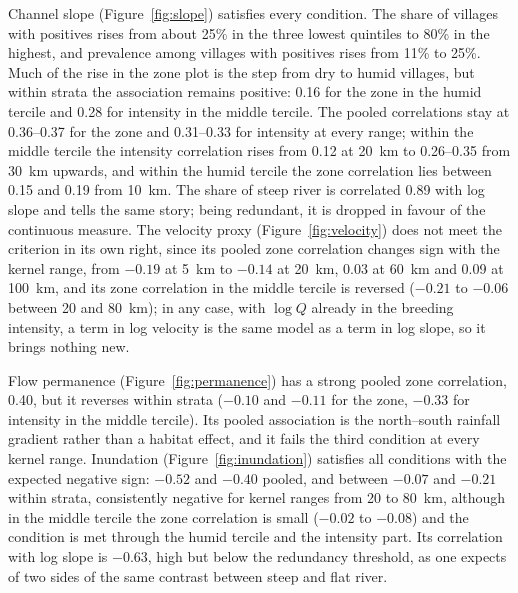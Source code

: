 \documentclass[11pt,a4paper]{article}
\begin{document}
Channel slope (Figure~\ref{fig:slope}) satisfies every condition. The share of villages with positives rises from about 25\% in the three lowest quintiles to 80\% in the highest, and prevalence among villages with positives rises from 11\% to 25\%. Much of the rise in the zone plot is the step from dry to humid villages, but within strata the association remains positive: 0.16 for the zone in the humid tercile and 0.28 for intensity in the middle tercile. The pooled correlations stay at 0.36--0.37 for the zone and 0.31--0.33 for intensity at every range; within the middle tercile the intensity correlation rises from 0.12 at 20~km to 0.26--0.35 from 30~km upwards, and within the humid tercile the zone correlation lies between 0.15 and 0.19 from 10~km. The share of steep river is correlated 0.89 with log slope and tells the same story; being redundant, it is dropped in favour of the continuous measure. The velocity proxy (Figure~\ref{fig:velocity}) does not meet the criterion in its own right, since its pooled zone correlation changes sign with the kernel range, from $-0.19$ at 5~km to $-0.14$ at 20~km, 0.03 at 60~km and 0.09 at 100~km, and its zone correlation in the middle tercile is reversed ($-0.21$ to $-0.06$ between 20 and 80~km); in any case, with $\log Q$ already in the breeding intensity, a term in log velocity is the same model as a term in log slope, so it brings nothing new.

Flow permanence (Figure~\ref{fig:permanence}) has a strong pooled zone correlation, 0.40, but it reverses within strata ($-0.10$ and $-0.11$ for the zone, $-0.33$ for intensity in the middle tercile). Its pooled association is the north--south rainfall gradient rather than a habitat effect, and it fails the third condition at every kernel range. Inundation (Figure~\ref{fig:inundation}) satisfies all conditions with the expected negative sign: $-0.52$ and $-0.40$ pooled, and between $-0.07$ and $-0.21$ within strata, consistently negative for kernel ranges from 20 to 80~km, although in the middle tercile the zone correlation is small ($-0.02$ to $-0.08$) and the condition is met through the humid tercile and the intensity part. Its correlation with log slope is $-0.63$, high but below the redundancy threshold, as one expects of two sides of the same contrast between steep and flat river.
\end{document}
